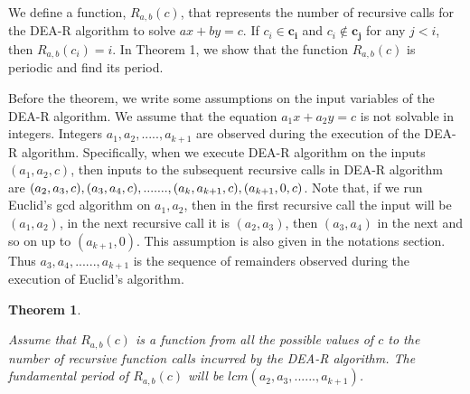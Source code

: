 \documentclass[pdflatex,sn-mathphys-num]{sn-jnl}%
\theoremstyle{thmstyleone}%
\newtheorem{theorem}{Theorem}%
\theoremstyle{thmstyletwo}%
\theoremstyle{thmstylethree}%
\begin{document}
\par We define a function, $R_{a,b}(c)$, that represents the number of recursive calls for the DEA-R algorithm to solve $ax+by=c$. If $c_i \in \mathbf{c_i}$ and $c_i \notin \mathbf{c_j}$ for any $j<i$,  then $R_{a,b}(c_i)=i$. In Theorem 1, we show that the function $R_{a,b}(c)$ is periodic and find its period. 
\par Before the theorem, we write some assumptions on the input variables of the DEA-R algorithm.  We assume that the equation $a_1x+a_2y=c$ is not solvable in integers. Integers $a_1,a_2,.....,a_{k+1}$ are observed during the execution of the DEA-R algorithm. Specifically, when we execute DEA-R algorithm on the inputs $(a_1,a_2,c)$, then inputs to the subsequent recursive calls in DEA-R algorithm are $(a_2,a_3,c),(a_3,a_4,c),\\.......,(a_k,a_{k+1},c),(a_{k+1},0,c)$. Note that, if we run Euclid's gcd algorithm on $a_1,a_2$, then in the first recursive call the input will be $(a_1,a_2)$, in the next recursive call it is $(a_2,a_3)$, then $(a_3,a_4)$ in the next and so on up to $(a_{k+1},0)$. This assumption is also given in the notations section. Thus $a_3,a_4,......, a_{k+1}$ is the sequence of remainders observed during the execution of Euclid's algorithm. 
\newline  
\begin{theorem} \label{theo10}

 Assume that $R_{a,b}(c)$ is a function from all the possible values of $c$ to the number of recursive function calls incurred by the DEA-R algorithm. The fundamental period of $R_{a,b}(c)$ will be $lcm(a_2,a_3,......,a_{k+1})$.
 
    
\end{theorem}
\end{document}
